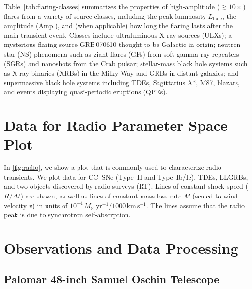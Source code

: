 \documentclass{nature_plusfigure}
\begin{document}
\begin{methods}
Table~\ref{tab:flaring-classes} summarizes the properties of high-amplitude ($\gtrsim 10\times$) flares from a variety of source classes,
including the peak luminosity $L_\mathrm{flare}$, the amplitude (Amp.), and (when applicable) how long the flaring lasts after the main transient event.
Classes include ultraluminous X-ray sources (ULXs\cite{Mucciarelli2007}); a mysterious flaring source GRB\,070610 thought to be Galactic in origin\cite{Kasliwal2008,Stefanescu2008,CastroTirado2008};
neutron star (NS) phenomena such as giant flares (GFs) from soft gamma-ray repeaters (SGRs\cite{Hurley1999}) and nanoshots from the Crab pulsar\cite{Hankins2003}; stellar-mass black hole systems such as X-ray binaries (XRBs\cite{Fender1997}) in the Milky Way and GRBs\cite{Racusin2008} in distant galaxies; and supermassive black hole systems including TDEs\cite{vanVelzen2021,Payne2022}, Sagittarius A*\cite{Marrone2008}, M87\cite{Abramowski2012}, blazars\cite{Nesci2021}, and events displaying quasi-periodic eruptions (QPEs\cite{Miniutti2023}).

\section{Data for Radio Parameter Space Plot}
\label{sec:data-radio-parameter-space}

In \ref{fig:radio}, we show a plot that is commonly used to characterize radio transients\cite{Chevalier1998,Ho2019}.
We plot data for CC~SNe (Type~II and Type~Ib/Ic), TDEs, LLGRBs, and two objects discovered by radio surveys (RT\cite{Dong2021,Mooley2022}). Lines of constant shock speed ($R/\Delta t$) are shown, as well as lines of constant mass-loss rate $\dot{M}$ (scaled to wind velocity $v$) in units of $10^{-4}\,M_\odot$\,yr$^{-1}/1000\,$km\,s$^{-1}$. The lines assume that the radio peak is due to synchrotron self-absorption\cite{Chevalier1998}. %

\section{Observations and Data Processing}

\subsection{Palomar 48-inch Samuel Oschin Telescope}
\label{sec:p48}


\end{methods}
\end{document}
